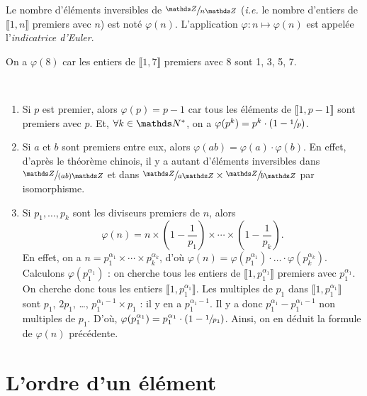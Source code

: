 \begin{defn}
	Le nombre d'éléments inversibles de $\sfrac\Z{n\Z}$ (\textit{i.e.} le nombre d'entiers de $\llbracket 1,n \rrbracket$ premiers avec $n$) est noté $\varphi(n)$.
	L'application $\varphi : n \mapsto \varphi(n)$ est appelée l'\textit{indicatrice d'Euler}.
\end{defn}

\begin{exmn}
	On a $\varphi(8)$ car les entiers de $\llbracket 1,7 \rrbracket$ premiers avec $8$ sont 1, 3, 5, 7.
\end{exmn}

\begin{met}~\\[-2\baselineskip]
	\begin{enumerate}[label=(\textit{\roman*})]
		\item Si $p$ est premier, alors $\varphi(p) = p - 1$ car tous les éléments de $\llbracket 1,p-1 \rrbracket$ sont premiers avec $p$.
			Et, $\forall k \in \N^*$, on a $\varphi(p^k) = p^k \cdot (1 - \sfrac{1}{p})$.
		\item Si $a$ et $b$ sont premiers entre eux, alors $\varphi(ab) = \varphi(a) \cdot \varphi(b)$. En effet, d'après le théorème chinois, il y a autant d'éléments inversibles dans $\sfrac\Z{(ab)\Z}$ et dans $\sfrac\Z{a\Z} \times \sfrac\Z{b\Z}$ par isomorphisme.
		\item Si $p_1, \ldots, p_k$ sont les diviseurs premiers de $n$, alors \[
				\varphi(n) = n \times \left( 1 - \frac{1}{p_1} \right) \times \cdots \times \left( 1 - \frac{1}{p_k} \right)
			.\]En effet, on a $n = p_1^{\alpha_1} \times \cdots \times p_k^{\alpha_k}$, d'où $\varphi(n) = \varphi(p_1^{\alpha_1}) \cdot \ldots \cdot \varphi(p_k^{\alpha_k})$.
			Calculons $\varphi(p_1^{\alpha_1})$ : on cherche tous les entiers de $\llbracket 1,p_1^{\alpha_1} \rrbracket$ premiers avec $p_1^{\alpha_1}$. On cherche donc tous les entiers $\llbracket 1,p_1^{\alpha_1} \rrbracket$. Les multiples de $p_1$ dans $\llbracket 1,p_1^{\alpha_1} \rrbracket$ sont $p_1$, $2p_1$, \ldots, $p_1^{\alpha_1 - 1} \times p_1$ : il y en a $p_1^{\alpha_1 - 1}$.
			Il y a donc $p_1^{\alpha_1} - p_1^{\alpha_1 - 1}$ non multiples de $p_1$.
			D'où, $\varphi(p_1^{\alpha_1}) = p_1^{\alpha_1} \cdot (1 - \sfrac 1{p_1})$.
			Ainsi, on en déduit la formule de $\varphi(n)$ précédente.
	\end{enumerate}
\end{met}

\section{L'ordre d'un élément}

